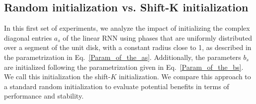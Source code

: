 \subsection{Random initialization vs. Shift-K initialization}

In this first set of experiments, we analyze the impact of initializing the complex diagonal entries $a_s$ of the linear RNN using phases that are uniformly distributed over a segment of the unit disk, with a constant radius close to 1, as described in the parametrization in Eq.~\eqref{Param_of_the_as}. Additionally, the parameters $b_s$ are initialized following the parametrization given in Eq.~\eqref{Param_of_the_bs}. We call this initialization the shift-$K$ initialization. We compare this approach to a standard random initialization to evaluate potential benefits in terms of performance and stability.


